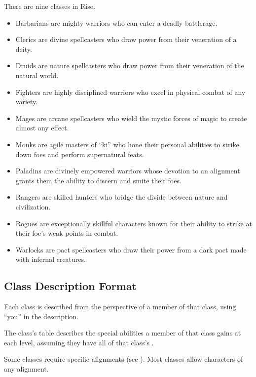     There are nine classes in Rise.
    \begin{itemize}
        \item Barbarians are mighty warriors who can enter a deadly battlerage.
        \item Clerics are divine spellcasters who draw power from their veneration of a deity.
        \item Druids are nature spellcasters who draw power from their veneration of the natural world.
        \item Fighters are highly disciplined warriors who excel in physical combat of any variety.
        \item Mages are arcane spellcasters who wield the mystic forces of magic to create almost any effect.
        \item Monks are agile masters of ``ki'' who hone their personal abilities to strike down foes and perform supernatural feats.
        \item Paladins are divinely empowered warriors whose devotion to an alignment grants them the ability to discern and smite their foes.
        \item Rangers are skilled hunters who bridge the divide between nature and civilization.
        \item Rogues are exceptionally skillful characters known for their ability to strike at their foe's weak points in combat.
        \item Warlocks are pact spellcasters who draw their power from a dark pact made with infernal creatures.
    \end{itemize}

    \subsection{Class Description Format}
        Each class is described from the perspective of a member of that class, using ``you'' in the description.

        The class's table describes the special abilities a member of that class gains at each level, assuming they have all of that class's .

        Some classes require specific alignments (see ).
        Most classes allow characters of any alignment.

